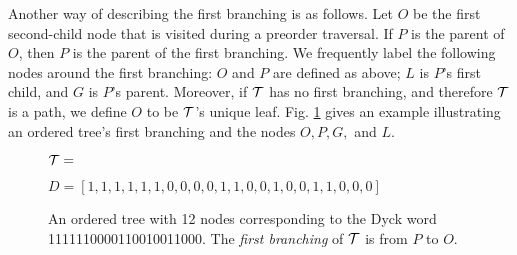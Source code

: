 
Another way of describing the first branching is as follows.
Let $O$ be the first second-child node that is visited during a preorder traversal.
If $P$ is the parent of $O$, then $P$ is the parent of the first branching.
We frequently label the following nodes around the first branching: $O$ and $P$ are defined as above; $L$ is $P$'s first child, and $G$ is $P$'s parent. Moreover, if $\mathcal{T}$ has no first branching, and therefore $\mathcal{T}$ is a path, we define $O$ to be $\mathcal{T}$'s unique leaf.
Fig. \ref{fig:exampleotree} gives an example illustrating an ordered tree's first branching and the nodes $O,P,G,$ and $L$.







\begin{figure}
    \centering
    $\mathcal{T}=$


    $D=[1, 1, 1, 1, 1, 1, 0, 0, 0, 0, 1, 1, 0, 0, 1, 0, 0, 1, 1, 0, 0, 0]$
    \caption{An ordered tree with 12 nodes corresponding to the Dyck word 1111110000110010011000.  The \emph{first branching} of $\mathcal{T}$ is from $P$ to $O$.}
    \label{fig:exampleotree}
\end{figure}

